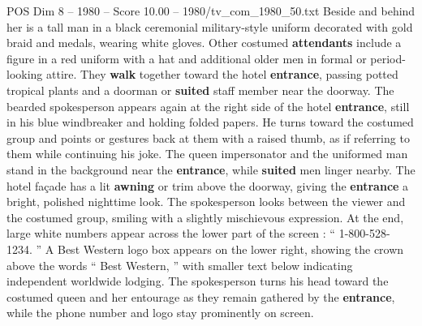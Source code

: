 \begin{textsample}{POS Dim 8 – 1980 – Score 10.00 – 1980/tv\_com\_1980\_50.txt}
Beside and behind her is a tall man in a black ceremonial military-style uniform decorated with gold braid and medals, wearing white gloves.
Other costumed \textbf{attendants} include a figure in a red uniform with a hat and additional older men in formal or period-looking attire.
They \textbf{walk} together toward the hotel \textbf{entrance}, passing potted tropical plants and a doorman or \textbf{suited} staff member near the doorway.
The bearded spokesperson appears again at the right side of the hotel \textbf{entrance}, still in his blue windbreaker and holding folded papers.
He turns toward the costumed group and points or gestures back at them with a raised thumb, as if referring to them while continuing his joke.
The queen impersonator and the uniformed man stand in the background near the \textbf{entrance}, while \textbf{suited} men linger nearby.
The hotel façade has a lit \textbf{awning} or trim above the doorway, giving the \textbf{entrance} a bright, polished nighttime look.
The spokesperson looks between the viewer and the costumed group, smiling with a slightly mischievous expression.
At the end, large white numbers appear across the lower part of the screen : “ 1-800-528-1234. ” A Best Western logo box appears on the lower right, showing the crown above the words “ Best Western, ” with smaller text below indicating independent worldwide lodging.
The spokesperson turns his head toward the costumed queen and her entourage as they remain gathered by the \textbf{entrance}, while the phone number and logo stay prominently on screen.

\end{textsample}
